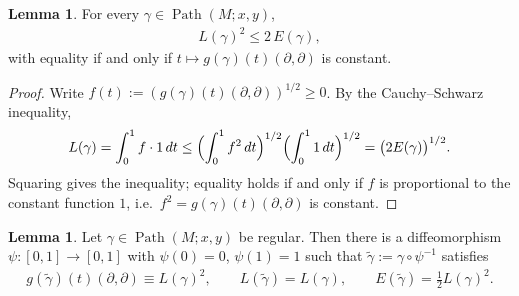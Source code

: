 \documentclass{amsart}
\DeclareMathOperator{\Path}{Path}
\theoremstyle{definition}
\newtheorem{lem}[thm]{Lemma}
\begin{document}
\begin{lem}\label{lem:energy-length}
  For every $\gamma \in \Path(M; x, y)$,
  \begin{align*}
    L(\gamma)^2 \le 2\, E(\gamma),
  \end{align*}
  with equality if and only if
  $t \mapsto g(\gamma)(t)(\partial, \partial)$ is constant.
\end{lem}

\begin{proof}
  Write $f(t) := (g(\gamma)(t)(\partial, \partial))^{1/2} \ge 0$.
  By the Cauchy--Schwarz inequality,
  \begin{align*}
    L(\gamma) = \int_0^1 f \cdot 1 \, dt
      \le \Bigl( \int_0^1 f^2 \, dt \Bigr)^{1/2}
          \Bigl( \int_0^1 1 \, dt \Bigr)^{1/2}
      = \bigl( 2 E(\gamma) \bigr)^{1/2}.
  \end{align*}
  Squaring gives the inequality; equality holds if and only if $f$ is
  proportional to the constant function $1$, i.e.\
  $f^2 = g(\gamma)(t)(\partial, \partial)$ is constant.
\end{proof}

\begin{lem}\label{lem:reparam}
  Let $\gamma \in \Path(M; x, y)$ be regular. Then there is a diffeomorphism
  $\psi \colon [0,1] \to [0,1]$ with $\psi(0) = 0$, $\psi(1) = 1$ such that
  $\widetilde\gamma := \gamma \circ \psi^{-1}$ satisfies
  \begin{align*}
    g(\widetilde\gamma)(t)(\partial, \partial) \equiv L(\gamma)^2,
    \qquad
    L(\widetilde\gamma) = L(\gamma),
    \qquad
    E(\widetilde\gamma) = \tfrac{1}{2} L(\gamma)^2.
  \end{align*}
\end{lem}
\end{document}
